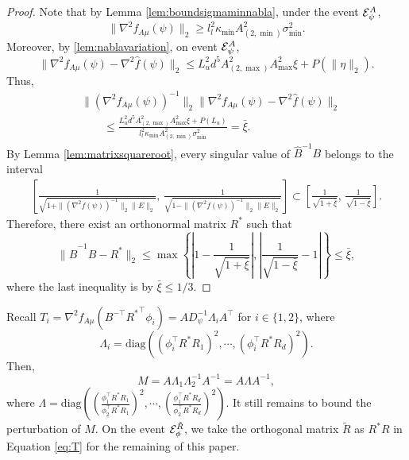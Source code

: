 \begin{proof}
	Note that by Lemma \ref{lem:boundsigmaminnabla},  under the event $\mathcal{E}^A_{\psi}$, \[\|\nabla^2f_{A\mu}(\psi)\|_2 \ge l_l^2\kappa_{\min}A^2_{(2,\min)}\sigma_{\min}^2.
	\]
	Moreover, by \cref{lem:nablavariation}, on event $\mathcal{E}^A_{\psi}$,
	\[
	\|\nabla^2 f_{A\mu}(\psi) - \nabla^2\hat{f}(\psi)\|_2 \le L_u^2  d^5 A_{(2,\max)}^2A_{\max}^2\xi + P(\|\eta\|_2).
	\]
	Thus,
	\begin{align*}
	&\|\left(\nabla^2f_{A\mu}(\psi)\right)^{-1}\|_2 \|\nabla^2 f_{A\mu}(\psi) - \nabla^2\hat{f}(\psi)\|_2 \\
	&\qquad \le \frac{L_u^2d^5 A_{(2,\max)}^2A_{\max}^2\xi + P(L_u)}{l_l^2\kappa_{\min}A^2_{(2,\min)}\sigma_{\min}^2} = \bar{\xi}.
	\end{align*}
	By Lemma \ref{lem:matrixsquareroot}, every singular value of $\hat{B}^{-1}B$ belongs to the interval
	\begin{align*}
	\left[\frac{1}{\sqrt{1 + \|\left(\nabla^2f(\psi)\right)^{-1}\|_2 \|E\|_2}},\, \frac{1}{\sqrt{1 - \|\left(\nabla^2f(\psi)\right)^{-1}\|_2 \|E\|_2}}\right] \subset \left[\frac{1}{\sqrt{1+\bar{\xi}}},\, \frac{1}{\sqrt{1-\bar{\xi}}}\right].
	\end{align*} 
	Therefore, there exist an orthonormal matrix $R^*$ such that 
	\[
	\|\hat{B}^{-1}B - R^*\|_2 \le \max \left\{ \left|1-\frac{1}{\sqrt{1+\bar{\xi}}}\right| , \left|\frac{1}{\sqrt{1-\bar{\xi}}}-1\right| \right\} \le \bar{\xi},
	\]
	where the last inequality is by $\bar{\xi} \le 1/3$.
\end{proof}

Recall $T_i = \nabla^2 f_{A\mu}(B^{-\top}{R^*}^{\top}\phi_i) = A D_{\psi}^{-1}\Lambda_iA^{\top}$ for $i \in \{1,2\}$,
where 
\[\Lambda_i = \text{diag}\left((\phi_i^{\top}R^*R_1)^2, \cdots, (\phi_i^{\top}R^*R_d)^2\right).
\] 
Then, 
\begin{equation}
\label{eq:T}
M = A \Lambda_1 \Lambda_2^{-1} A^{-1} = A \Lambda A^{-1},
\end{equation}
where $\Lambda = \text{diag}\left((\frac{\phi_1^{\top}R^*R_1}{\phi_2^{\top}R^*R_1})^2, \cdots, (\frac{\phi_1^{\top}R^*R_d}{\phi_2^{\top}R^*R_d})^2\right)$. 
It still remains to bound the perturbation of $M$. %
On the event $\mathcal{E}^{\tilde{R}}_{\phi}$, we take the orthogonal matrix $\tilde{R}$ as $R^*R$ in Equation \ref{eq:T} for the remaining of this paper.

